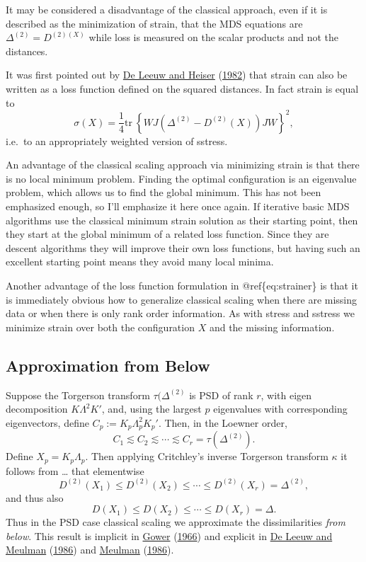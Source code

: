 \documentclass[
  12pt,
]{book}
\theoremstyle{definition}
\theoremstyle{definition}
\theoremstyle{definition}
\theoremstyle{definition}
\theoremstyle{remark}
\begin{document}
It may be considered a disadvantage of the classical approach, even if it is
described as the minimization of strain, that the MDS equations are \(\Delta^{(2)}= D^{(2)(X)}\) while loss is measured on the scalar products and not the distances.

It was first pointed out by \protect\hyperlink{ref-deleeuw_heiser_C_82}{De Leeuw and Heiser} (\protect\hyperlink{ref-deleeuw_heiser_C_82}{1982}) that strain can also be written as a loss function defined on the squared distances. In fact strain is equal to
\begin{equation}
\sigma(X)=\frac14\text{tr}\ \left\{WJ(\Delta^{(2)}-D^{(2)}(X))JW\right\}^2,
\label{eq:strainer}
\end{equation}
i.e.~to an appropriately weighted version of sstress.

An advantage of the classical scaling approach via minimizing strain is that there is no local minimum problem. Finding the optimal configuration is an eigenvalue problem, which allows us to find the global minimum. This has not been emphasized enough, so I'll emphasize it here once again. If iterative basic MDS algorithms use the classical minimum strain solution as their starting point, then they start at the global minimum of a related loss function. Since they are descent algorithms they will improve their own loss functions, but having such an excellent starting point means they avoid many local minima.

Another advantage of the loss function formulation in @ref\{eq:strainer\} is that it is immediately obvious how to generalize classical scaling when there are missing data or when there is only rank order information. As with stress and sstress we minimize strain over both the configuration \(X\) and the missing information.

\hypertarget{approximation-from-below}{%
\subsection{Approximation from Below}\label{approximation-from-below}}

Suppose the Torgerson transform \(\tau(\Delta^{(2)}\) is PSD of rank \(r\), with eigen decomposition \(K\Lambda^2 K'\), and, using the largest \(p\) eigenvalues with corresponding eigenvectors, define \(C_p:=K_p\Lambda_p^2 K_p'\). Then, in the Loewner order,
\[
C_1\lesssim C_2\lesssim\cdots\lesssim C_r=\tau(\Delta^{(2)}).
\]
Define \(X_p=K_p\Lambda_p\). Then applying Critchley's inverse Torgerson transform \(\kappa\) it follows from \ldots{} that elementwise
\[
D^{(2)}(X_1)\leq D^{(2)}(X_2)\leq\cdots\leq D^{(2)}(X_r)=\Delta^{(2)},
\]
and thus also
\[
D(X_1)\leq D(X_2)\leq\cdots\leq D(X_r)=\Delta.
\]
Thus in the PSD case classical scaling we approximate the dissimilarities \emph{from below}. This result is implicit in \protect\hyperlink{ref-gower_66}{Gower} (\protect\hyperlink{ref-gower_66}{1966}) and explicit in \protect\hyperlink{ref-deleeuw_meulman_C_86}{De Leeuw and Meulman} (\protect\hyperlink{ref-deleeuw_meulman_C_86}{1986}) and \protect\hyperlink{ref-meulman_86}{Meulman} (\protect\hyperlink{ref-meulman_86}{1986}).
\end{document}
